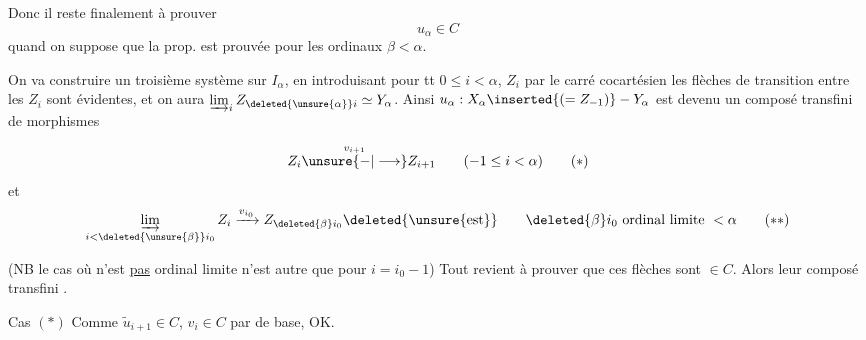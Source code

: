 Donc il reste finalement à prouver
\[
 u_\alpha\in C
\]
quand on suppose que la prop. est prouvée pour les ordinaux $\beta<\alpha$.

On va construire un troisième système  sur $I_\alpha$, en  introduisant pour tt $0\leq i<\alpha$,  $Z_i$ par le carré cocartésien
les flèches de transition entre les $Z_i$ sont évidentes, et on aura  $\varinjlim_i Z_{\deleted{\unsure{\alpha}}i}\simeq Y_\alpha$. Ainsi $u_\alpha:X_\alpha\inserted{(=Z_{-1})}-Y_\alpha$  est devenu un composé transfini de morphismes 

\[
 Z_i\overset{v_{i+1}}{\unsure{-|\longrightarrow}}Z_{i+1}\qquad(-1\leq i<\alpha) \tag*{$(*)$}
\]
et
\[
 \varinjlim_{i<\deleted{\unsure{\beta}}i_0}Z_i\xrightarrow{v_{i_0}}Z_{\deleted{\beta}i_0}\deleted{\unsure{\text{est}}}\qquad
 \deleted{\beta}i_0\text{ ordinal limite }<\alpha \tag*{$(**)$}
\]

(NB le cas où \deleted{$\beta$} n'est \uline{pas} ordinal limite n'est autre que \unsure{$(*)$} pour $i=i_0-1$) Tout revient à prouver que ces flèches sont $\in C$. Alors leur composé transfini . 

Cas $(*)$
Comme $\widetilde u_{i+1}\in C$, $v_i\in C$ par  de base, OK.

